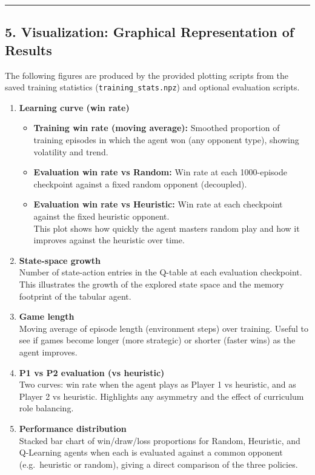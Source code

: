 \documentclass[
]{article}
\providecommand{\tightlist}{%
  \setlength{\itemsep}{0pt}\setlength{\parskip}{0pt}}
\begin{document}
\begin{center}\rule{0.5\linewidth}{0.5pt}\end{center}

\subsection{5. Visualization: Graphical Representation of
Results}\label{visualization-graphical-representation-of-results}

The following figures are produced by the provided plotting scripts from
the saved training statistics (\texttt{training\_stats.npz}) and
optional evaluation scripts.

\begin{enumerate}
\def\labelenumi{\arabic{enumi}.}
\item
  \textbf{Learning curve (win rate)}

  \begin{itemize}
  \tightlist
  \item
    \textbf{Training win rate (moving average):} Smoothed proportion of
    training episodes in which the agent won (any opponent type),
    showing volatility and trend.\\
  \item
    \textbf{Evaluation win rate vs Random:} Win rate at each
    1000-episode checkpoint against a fixed random opponent
    (decoupled).\\
  \item
    \textbf{Evaluation win rate vs Heuristic:} Win rate at each
    checkpoint against the fixed heuristic opponent.\\
    This plot shows how quickly the agent masters random play and how it
    improves against the heuristic over time.
  \end{itemize}
\item
  \textbf{State-space growth}\\
  Number of state-action entries in the Q-table at each evaluation
  checkpoint. This illustrates the growth of the explored state space
  and the memory footprint of the tabular agent.
\item
  \textbf{Game length}\\
  Moving average of episode length (environment steps) over training.
  Useful to see if games become longer (more strategic) or shorter
  (faster wins) as the agent improves.
\item
  \textbf{P1 vs P2 evaluation (vs heuristic)}\\
  Two curves: win rate when the agent plays as Player 1 vs heuristic,
  and as Player 2 vs heuristic. Highlights any asymmetry and the effect
  of curriculum role balancing.
\item
  \textbf{Performance distribution}\\
  Stacked bar chart of win/draw/loss proportions for Random, Heuristic,
  and Q-Learning agents when each is evaluated against a common opponent
  (e.g.~heuristic or random), giving a direct comparison of the three
  policies.
\end{enumerate}
\end{document}

